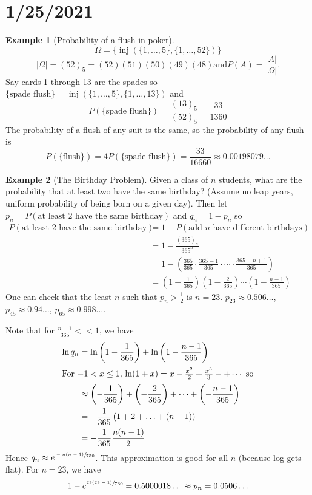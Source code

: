 \documentclass{article}
\DeclareMathOperator{\inj}{inj}
\newcommand{\p}[1]{\left(#1\right)} %
\theoremstyle{definition}
\newtheorem*{example}{Example}
\begin{document}
\section*{1/25/2021}
\begin{example}[Probability of a flush in poker]
\[\Omega = \{\inj(\{1, \ldots, 5\}, \{1, \ldots, 52\})\}\]
\[|\Omega| = (52)_5 = (52)(51)(50)(49)(48)
\text{and} P(A) = \frac{|A|}{|\Omega|}.\]
Say cards 1 through 13 are the spades so $\{\text{spade flush}\} = \inj(\{1, \ldots, 5\}, \{1, \ldots, 13\})$ and
\[P(\{\text{spade flush}\}) = \frac{(13)_5}{(52)_5} = \frac{33}{1360}\]
The probability of a flush of any suit is the same, so the probability of any flush is
\[
    P(\{\text{flush}\}) = 4P(\{\text{spade flush}\}) = \frac{33}{16660}
    \approx 0.00198079\ldots
\]
\end{example}
\newpage
\begin{example}[The Birthday Problem]
Given a class of $n$ students, what are the probability that at least two have the same birthday? (Assume no leap years, uniform probability of being born on a given day). Then let $p_n = P(\text{at least 2 have the same birthday})$ and $q_n = 1 - p_n$ so
\begin{align*}
    P(\text{at least 2 have the same birthday})
    &= 1 - P(\text{add } n \text{ have different birthdays}) \\
    &= 1 - \frac{(365)_n}{365^n} \\
    &= 1 - \p{\frac{365}{365}\cdot\frac{365-1}{365}\cdot\cdots\cdot\frac{365-n+1}{365}} \\
    &= \p{1 - \frac{1}{365}}\p{1 - \frac{2}{365}}\cdots\p{1 - \frac{n-1}{365}}
\end{align*}
One can check that the least $n$ such that $p_n > \frac{1}{2}$ is $n = 23$.
$p_{23} \approx 0.506\ldots$, $p_{45} \approx 0.94\ldots$, $p_{65} \approx 0.998\ldots$.

Note that for $\frac{n-1}{365} << 1$, we have
\begin{align*}
    \ln q_n &= \ln\p{1 - \frac{1}{365}} + \ln\p{1 - \frac{n-1}{365}} \\
    \intertext{For $-1 < x \leq 1$, $\ln(1+x) = x - \frac{x^2}{2} + \frac{x^3}{3} -+\cdots$ so}
    &\approx \p{-\frac{1}{365}} + \p{-\frac{2}{365}} + \cdots + \p{-\frac{n-1}{365}} \\
    &= -\frac{1}{365}\p{1 + 2 + \ldots + (n-1)} \\
    &= -\frac{1}{365}\frac{n(n-1)}{2}
\end{align*}
Hence $q_n \approx e^{\sfrac{-n(n-1)}{730}}$. This approximation is good for all $n$ (because log gets flat). For $n = 23$, we have
\[
    1 - e^{\sfrac{23(23-1)}{730}} = 0.5000018\ldots \approx p_n = 0.0506\ldots
\]

\end{example}
\end{document}
